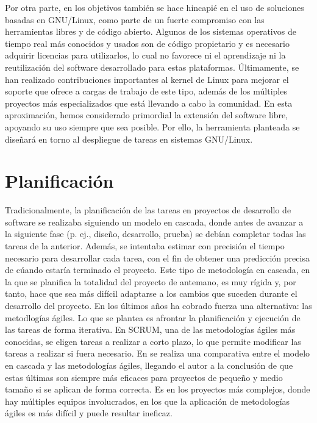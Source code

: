Por otra parte, en los objetivos también se hace hincapié en el uso de
soluciones basadas en GNU/Linux, como parte de un fuerte compromiso con las
herramientas libres y de código abierto. Algunos de los sistemas operativos de
tiempo real más conocidos y usados son de código propietario y es necesario
adquirir licencias para utilizarlos, lo cual no favorece ni el aprendizaje ni la
reutilización del software desarrollado para estas plataformas. Últimamente, se
han realizado contribuciones importantes al kernel de Linux para mejorar el
soporte que ofrece a cargas de trabajo de este tipo, además de los múltiples
proyectos más especializados que está llevando a cabo la comunidad. En esta
aproximación, hemos considerado primordial la extensión del software libre,
apoyando su uso siempre que sea posible. Por ello, la herramienta planteada se
diseñará en torno al despliegue de tareas en sistemas GNU/Linux.

\section{Planificación}

Tradicionalmente, la planificación de las tareas en proyectos de desarrollo de
software se realizaba siguiendo un modelo en cascada, donde antes de avanzar a
la siguiente fase (p. ej., diseño, desarrollo, prueba) se debían completar todas
las tareas de la anterior. Además, se intentaba estimar con precisión el tiempo
necesario para desarrollar cada tarea, con el fin de obtener una predicción
precisa de cúando estaría terminado el proyecto. Este tipo de metodología en
cascada, en la que se planifica la totalidad del proyecto de antemano, es muy
rígida y, por tanto, hace que sea más difícil adaptarse a los cambios que
suceden durante el desarrollo del proyecto. En los últimos años ha cobrado
fuerza una alternativa: las metodlogías ágiles. Lo que se plantea es afrontar la
planificación y ejecución de las tareas de forma iterativa. En SCRUM, una de las
metodologías ágiles más conocidas, se eligen tareas a realizar a corto plazo, lo
que permite modificar las tareas a realizar si fuera necesario. En
\cite{casteren_waterfall_2017} se realiza una comparativa entre el modelo en
cascada y las metodologías ágiles, llegando el autor a la conclusión de que
estas últimas son siempre más eficaces para proyectos de pequeño y medio tamaño
si se aplican de forma correcta. Es en los proyectos más complejos, donde hay
múltiples equipos involucrados, en los que la aplicación de metodologías ágiles
es más difícil y puede resultar ineficaz.

